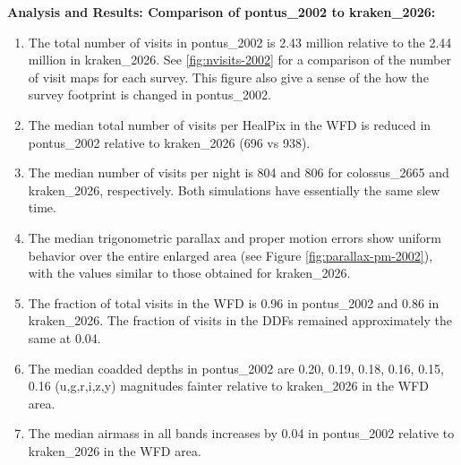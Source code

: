 \documentclass[DM,lsstdraft,authoryear,toc]{lsstdoc}
\begin{document}
\textbf{Analysis and Results: Comparison of pontus\_2002 to kraken\_2026:}

\begin{enumerate}
\item The total number of visits in pontus\_2002 is 2.43 million relative to the 2.44 million in kraken\_2026. See \autoref{fig:nvisits-2002}
for a comparison of the number of visit maps for each survey. This figure also give a sense of the how the survey footprint is changed
in pontus\_2002.
\item The median total number of visits per HealPix in the WFD is reduced in pontus\_2002 relative to kraken\_2026 (696 vs 938).
\item The median number of visits per night is 804 and 806 for colossus\_2665 and kraken\_2026, respectively.
Both simulations have essentially the same slew time.
\item The median trigonometric parallax and proper motion errors show uniform behavior over the entire enlarged area 
(see Figure \autoref{fig:parallax-pm-2002}), with the values similar to those obtained for kraken\_2026.
\item The fraction of total visits in the WFD is 0.96 in pontus\_2002 and 0.86 in kraken\_2026. The fraction of visits
in the DDFs remained approximately the same at 0.04.
\item The median coadded depths in pontus\_2002 are 0.20, 0.19, 0.18, 0.16, 0.15, 0.16 (u,g,r,i,z,y) magnitudes fainter relative 
to kraken\_2026 in the WFD area.
\item The median airmass in all bands increases by 0.04 in pontus\_2002 relative to kraken\_2026 in the WFD area.
\end{enumerate}
\end{document}
